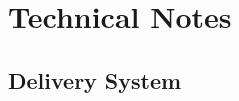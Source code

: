 \documentclass[
  a4paper,
]{scrbook}
\begin{document}
\hypertarget{technical-notes}{%
\section{Technical Notes}\label{technical-notes}}

\hypertarget{sec-delivery-system}{%
\subsection{Delivery System}\label{sec-delivery-system}}

\begin{figure}

\begin{minipage}[t]{0.11\linewidth}

{\centering 

~

}

\end{minipage}%
%
\begin{minipage}[t]{0.03\linewidth}

{\centering 


}

\end{minipage}%
%
\begin{minipage}[t]{0.01\linewidth}

{\centering 

~

}

\end{minipage}%
%
\begin{minipage}[t]{0.70\linewidth}

{\centering 


}


\end{minipage}
\end{figure}
\end{document}
